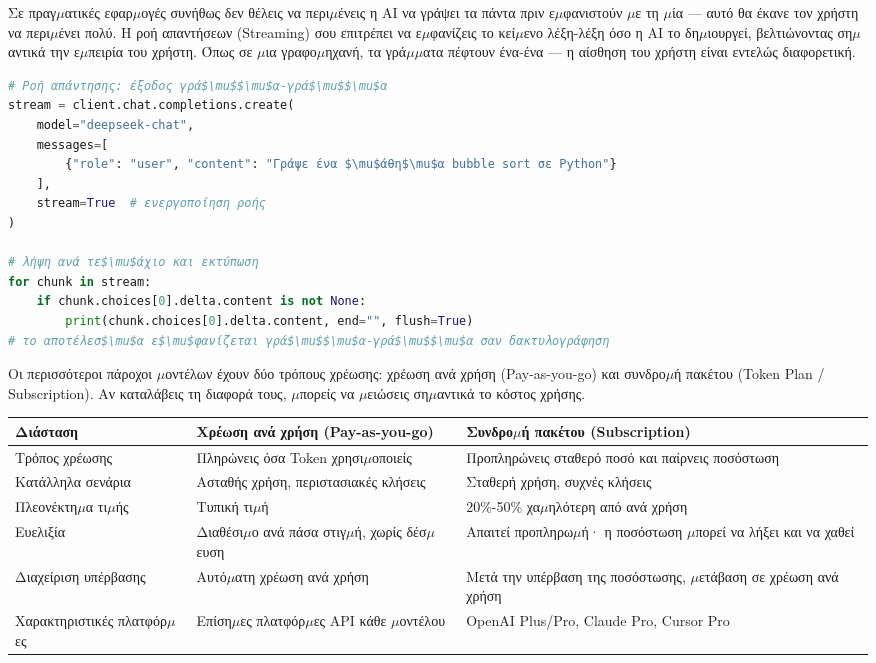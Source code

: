 
Σε πραγ$\mu$ατικές εφαρ$\mu$ογές συνήθως δεν θέλεις να περι$\mu$ένεις η AI να γράψει τα πάντα πριν ε$\mu$φανιστούν $\mu$ε τη $\mu$ία — αυτό θα έκανε τον χρήστη να περι$\mu$ένει πολύ. Η ροή απαντήσεων (Streaming) σου επιτρέπει να ε$\mu$φανίζεις το κεί$\mu$ενο λέξη-λέξη όσο η AI το δη$\mu$ιουργεί, βελτιώνοντας ση$\mu$αντικά την ε$\mu$πειρία του χρήστη. Όπως σε $\mu$ια γραφο$\mu$ηχανή, τα γρά$\mu$$\mu$ατα πέφτουν ένα-ένα — η αίσθηση του χρήστη είναι εντελώς διαφορετική.

\begin{lstlisting}[language=Python]
# Ροή απάντησης: έξοδος γρά$\mu$$\mu$α-γρά$\mu$$\mu$α
stream = client.chat.completions.create(
    model="deepseek-chat",
    messages=[
        {"role": "user", "content": "Γράψε ένα $\mu$άθη$\mu$α bubble sort σε Python"}
    ],
    stream=True  # ενεργοποίηση ροής
)

# λήψη ανά τε$\mu$άχιο και εκτύπωση
for chunk in stream:
    if chunk.choices[0].delta.content is not None:
        print(chunk.choices[0].delta.content, end="", flush=True)
# το αποτέλεσ$\mu$α ε$\mu$φανίζεται γρά$\mu$$\mu$α-γρά$\mu$$\mu$α σαν δακτυλογράφηση
\end{lstlisting}


Οι περισσότεροι πάροχοι $\mu$οντέλων έχουν δύο τρόπους χρέωσης: χρέωση ανά χρήση (Pay-as-you-go) και συνδρο$\mu$ή πακέτου (Token Plan / Subscription). Αν καταλάβεις τη διαφορά τους, $\mu$πορείς να $\mu$ειώσεις ση$\mu$αντικά το κόστος χρήσης.


\begin{center}
\begin{tabularx}{\linewidth}{|X|X|X|}
\hline
\textbf{Διάσταση} & \textbf{Χρέωση ανά χρήση (Pay-as-you-go)} & \textbf{Συνδρο$\mu$ή πακέτου (Subscription)} \tabularnewline
\hline
Τρόπος χρέωσης & Πληρώνεις όσα Token χρησι$\mu$οποιείς & Προπληρώνεις σταθερό ποσό και παίρνεις ποσόστωση \tabularnewline
Κατάλληλα σενάρια & Ασταθής χρήση, περιστασιακές κλήσεις & Σταθερή χρήση, συχνές κλήσεις \tabularnewline
Πλεονέκτη$\mu$α τι$\mu$ής & Τυπική τι$\mu$ή & 20\%-50\% χα$\mu$ηλότερη από ανά χρήση \tabularnewline
Ευελιξία & Διαθέσι$\mu$ο ανά πάσα στιγ$\mu$ή, χωρίς δέσ$\mu$ευση & Απαιτεί προπληρω$\mu$ή· η ποσόστωση $\mu$πορεί να λήξει και να χαθεί \tabularnewline
Διαχείριση υπέρβασης & Αυτό$\mu$ατη χρέωση ανά χρήση & Μετά την υπέρβαση της ποσόστωσης, $\mu$ετάβαση σε χρέωση ανά χρήση \tabularnewline
Χαρακτηριστικές πλατφόρ$\mu$ες & Επίση$\mu$ες πλατφόρ$\mu$ες API κάθε $\mu$οντέλου & OpenAI Plus/Pro, Claude Pro, Cursor Pro \tabularnewline
\hline
\end{tabularx}
\end{center}

